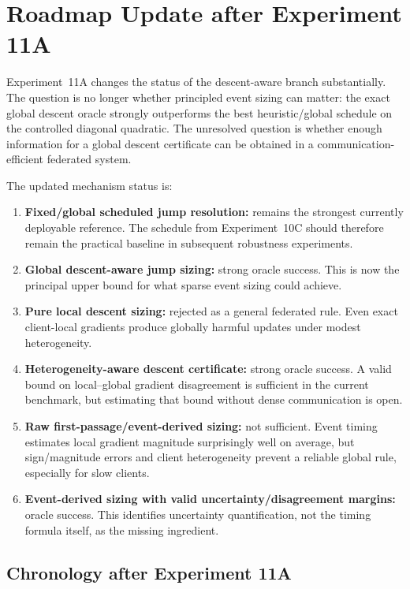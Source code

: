 \section{Roadmap Update after Experiment 11A}
\label{sec:roadmap-post-11a}

Experiment~11A changes the status of the descent-aware branch substantially. The question is no longer whether principled event sizing can matter: the exact global descent oracle strongly outperforms the best heuristic/global schedule on the controlled diagonal quadratic. The unresolved question is whether enough information for a global descent certificate can be obtained in a communication-efficient federated system.

The updated mechanism status is:
\begin{enumerate}
  \item \textbf{Fixed/global scheduled jump resolution:} remains the strongest currently deployable reference. The schedule from Experiment~10C should therefore remain the practical baseline in subsequent robustness experiments.
  \item \textbf{Global descent-aware jump sizing:} strong oracle success. This is now the principal upper bound for what sparse event sizing could achieve.
  \item \textbf{Pure local descent sizing:} rejected as a general federated rule. Even exact client-local gradients produce globally harmful updates under modest heterogeneity.
  \item \textbf{Heterogeneity-aware descent certificate:} strong oracle success. A valid bound on local--global gradient disagreement is sufficient in the current benchmark, but estimating that bound without dense communication is open.
  \item \textbf{Raw first-passage/event-derived sizing:} not sufficient. Event timing estimates local gradient magnitude surprisingly well on average, but sign/magnitude errors and client heterogeneity prevent a reliable global rule, especially for slow clients.
  \item \textbf{Event-derived sizing with valid uncertainty/disagreement margins:} oracle success. This identifies uncertainty quantification, not the timing formula itself, as the missing ingredient.
\end{enumerate}

\subsection{Chronology after Experiment 11A}

